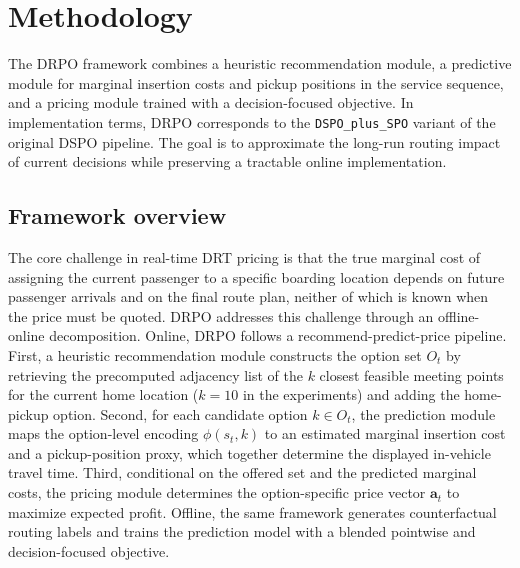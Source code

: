 \documentclass[preprint,12pt,authoryear]{elsarticle}
\begin{document}
\section{Methodology}
\label{sec:method}

The DRPO framework combines a heuristic recommendation module, a predictive module for marginal insertion costs and pickup positions in the service sequence, and a pricing module trained with a decision-focused objective. In implementation terms, DRPO corresponds to the \texttt{DSPO\_plus\_SPO} variant of the original DSPO pipeline. The goal is to approximate the long-run routing impact of current decisions while preserving a tractable online implementation.

\subsection{Framework overview}

The core challenge in real-time DRT pricing is that the true marginal cost of assigning the current passenger to a specific boarding location depends on future passenger arrivals and on the final route plan, neither of which is known when the price must be quoted. DRPO addresses this challenge through an offline-online decomposition. Online, DRPO follows a recommend-predict-price pipeline. First, a heuristic recommendation module constructs the option set $O_t$ by retrieving the precomputed adjacency list of the $k$ closest feasible meeting points for the current home location ($k=10$ in the experiments) and adding the home-pickup option. Second, for each candidate option $k\in O_t$, the prediction module maps the option-level encoding $\phi(s_t,k)$ to an estimated marginal insertion cost and a pickup-position proxy, which together determine the displayed in-vehicle travel time. Third, conditional on the offered set and the predicted marginal costs, the pricing module determines the option-specific price vector $\mathbf{a}_t$ to maximize expected profit. Offline, the same framework generates counterfactual routing labels and trains the prediction model with a blended pointwise and decision-focused objective.
\end{document}
